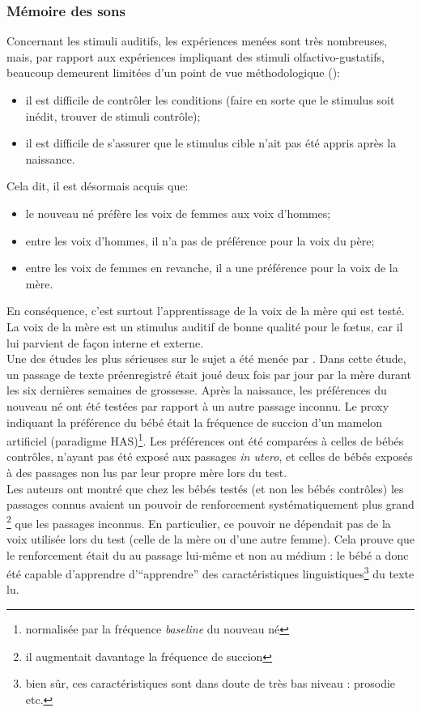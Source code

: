 \documentclass[french]{article}
\begin{document}
			\subsubsection{Mémoire des sons}
				Concernant les stimuli auditifs, les expériences menées sont très nombreuses, mais, par rapport aux expériences impliquant des stimuli olfactivo-gustatifs, beaucoup demeurent limitées d'un point de vue méthodologique (\cite{james2010}):
				\begin{itemize}
					\item il est difficile de contrôler les conditions (faire en sorte que le stimulus soit inédit, trouver de stimuli contrôle);
					\item  il est difficile de s'assurer que le stimulus cible n'ait pas été appris après la naissance.
				\end{itemize}
				Cela dit, il est désormais acquis que:
				\begin{itemize}
					\item le nouveau né préfère les voix de femmes aux voix d'hommes;
					\item entre les voix d'hommes, il n'a pas de préférence pour la voix du père;
					\item entre les voix de femmes en revanche, il a une préférence pour la voix de la mère.
				\end{itemize}
				En conséquence, c'est surtout l'apprentissage de la voix de la mère qui est testé. La voix de la mère est un stimulus auditif de bonne qualité pour le fœtus, car il lui parvient de façon interne et externe.\\
				
				Une des études les plus sérieuses sur le sujet a été menée par \cite{deCasper1986}. Dans cette étude, un passage de texte préenregistré était joué deux fois par jour par la mère durant les six dernières semaines de grossesse. Après la naissance, les préférences du nouveau né ont été testées par rapport à un autre passage inconnu. Le proxy indiquant la préférence du bébé était la fréquence de succion d'un mamelon artificiel (paradigme HAS)\footnote{normalisée par la fréquence \textit{baseline} du nouveau né}. Les préférences ont été comparées à celles de bébés contrôles, n'ayant pas été exposé aux passages \textit{in utero}, et celles de bébés exposés à des passages non lus par leur propre mère lors du test.\\
				Les auteurs ont montré que chez les bébés testés (et non les bébés contrôles) les passages connus avaient un pouvoir de renforcement systématiquement plus grand \footnote{il augmentait davantage la fréquence de succion} que les passages inconnus. En particulier, ce pouvoir ne dépendait pas de la voix utilisée lors du test (celle de la mère ou d'une autre femme). Cela prouve que le renforcement était du au passage lui-même et non au médium : le bébé a donc été capable d'apprendre d'``apprendre'' des caractéristiques linguistiques\footnote{bien sûr, ces caractéristiques sont dans doute de très bas niveau : prosodie etc.} du texte lu.\\
				
\end{document}
